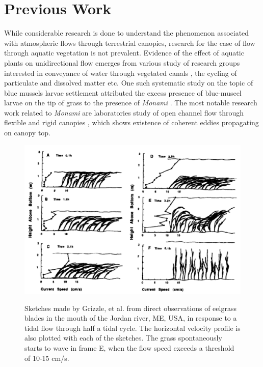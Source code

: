 \documentclass[12pt]{report}   %
\begin{document}
\section{Previous Work}
While considerable research is done to understand the phenomenon associated with atmospheric flows through terrestrial canopies, research for the case of flow through aquatic vegetation is not prevalent. Evidence of the effect of aquatic plants on unidirectional flow emerges from various study of research groups interested in conveyance of water through vegetated canals \cite{kouwen93}, the cycling of particulate and dissolved matter etc. One such systematic study on the topic of blue mussels larvae settlement attributed the excess presence of blue-muscel larvae on the tip of grass to the presence of \textit{Monami} \cite{Grizzle96}. The most notable research work related to \textit{Monami} are laboratories study of open channel flow through flexible and rigid canopies \cite{Ikeda96,Ghisal02}, which shows existence of coherent eddies propagating on canopy top. 
\begin{figure}
 {\includegraphics[scale=0.72]{Grizzle}}
 \caption{Sketches made by Grizzle, et al. \citep{Grizzle96} from direct observations of eelgrass blades in the mouth of the Jordan river, ME, USA, in response to a tidal
 flow through half a tidal cycle. The horizontal velocity profile is also plotted with each of the sketches. The grass spontaneously starts to wave in frame E, when the flow 
 speed exceeds a threshold of 10-15 cm/s.}
 \label{GrizzleFig}
\end{figure}
\end{document}
